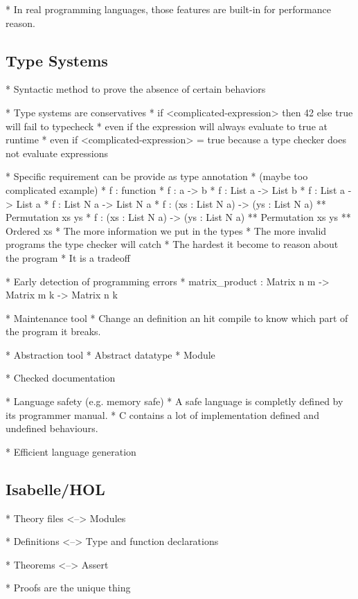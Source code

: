 \documentclass[a4paper, oneside, 12pt, titlepage]{article}
\begin{document}
  * In real programming languages, those features are built-in for performance reason.

\subsection{Type Systems}

  * Syntactic method to prove the absence of certain behaviors

  * Type systems are conservatives
    * if <complicated-expression> then 42 else true will fail to typecheck
      * even if the expression will always evaluate to true at runtime
      * even if <complicated-expression> = true because a type checker does not evaluate expressions

  * Specific requirement can be provide as type annotation
    * (maybe too complicated example)
    * f : function
    * f : a -> b
    * f : List a -> List b
    * f : List a -> List a
    * f : List N a -> List N a
    * f : (xs : List N a) -> (ys : List N a) ** Permutation xs ys
    * f : (xs : List N a) -> (ys : List N a) ** Permutation xs ys ** Ordered xs
    * The more information we put in the types
      * The more invalid programs the type checker will catch
      * The hardest it become to reason about the program
      * It is a tradeoff

  * Early detection of programming errors
    * matrix\_product : Matrix n m -> Matrix m k -> Matrix n k

  * Maintenance tool
    * Change an definition an hit compile to know which part of the program it breaks.

  * Abstraction tool
    * Abstract datatype
    * Module

  * Checked documentation

  * Language safety (e.g. memory safe)
    * A safe language is completly defined by its programmer manual.
      * C contains a lot of implementation defined and undefined behaviours.

  * Efficient language generation

\subsection{Isabelle/HOL}

  * Theory files <--> Modules

  * Definitions <--> Type and function declarations

  * Theorems <--> Assert

  * Proofs are the unique thing
\end{document}
